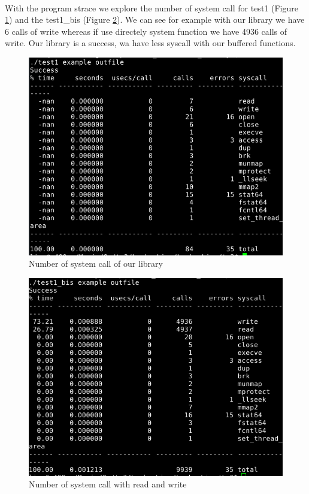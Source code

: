 \documentclass[a4paper,10pt]{article}
\begin{document}
\paragraph{} With the program strace we explore
the number of system call for test1 (Figure \ref{our}) and the 
test1\_bis (Figure \ref{sys}). We can see for example with our library
we have 6 calls of write whereas if use directely system function we have
4936 calls of write. Our library is a success, wa have less syscall with 
our buffered functions. 
\begin{figure}[ht]
\center 
\includegraphics[width=0.85\linewidth]{my_strace.png}
\caption{Number of system call of our library}
\label{our}
\end{figure}
\begin{figure}[ht]
\center 
\includegraphics[width=0.85\linewidth]{syscall_strace.png}
\caption{Number of system call with read and write}
\label{sys}
\end{figure}
\end{document}
